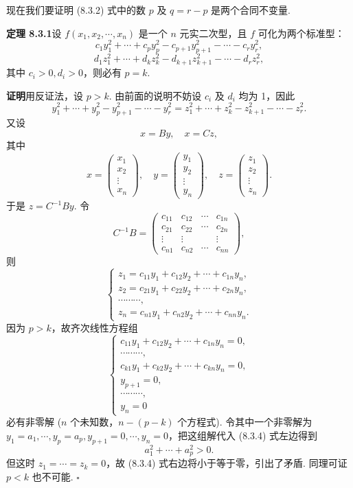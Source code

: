 \documentclass[UTF8,12pt,a4paper,fontset=fandol]{ctexart}
\begin{document}
现在我们要证明 (8.3.2) 式中的数 $p$ 及 $q=r-p$ 是两个合同不变量.

\noindent\textbf{定理 8.3.1}\quad 设 $f(x_1,x_2,\cdots,x_n)$ 是一个 $n$ 元实二次型，且 $f$ 可化为两个标准型：
\[
c_1y_1^2+\cdots+c_py_p^2-c_{p+1}y_{p+1}^2-\cdots-c_ry_r^2,
\]
\[
d_1z_1^2+\cdots+d_kz_k^2-d_{k+1}z_{k+1}^2-\cdots-d_rz_r^2,
\]
其中 $c_i>0,d_i>0$，则必有 $p=k$.

\noindent\textbf{证明}\quad 用反证法，设 $p>k$. 由前面的说明不妨设 $c_i$ 及 $d_i$ 均为 1，因此
\begin{equation}
y_1^2+\cdots+y_p^2-y_{p+1}^2-\cdots-y_r^2
=
z_1^2+\cdots+z_k^2-z_{k+1}^2-\cdots-z_r^2.
\tag{8.3.4}
\end{equation}
又设
\[
x=By,\quad x=Cz,
\]
其中
\[
x=\left(\begin{array}{c}x_1\\x_2\\\vdots\\x_n\end{array}\right),\quad
y=\left(\begin{array}{c}y_1\\y_2\\\vdots\\y_n\end{array}\right),\quad
z=\left(\begin{array}{c}z_1\\z_2\\\vdots\\z_n\end{array}\right).
\]
于是 $z=C^{-1}By$. 令
\[
C^{-1}B=\left(\begin{array}{cccc}
c_{11}&c_{12}&\cdots&c_{1n}\\
c_{21}&c_{22}&\cdots&c_{2n}\\
\vdots&\vdots&&\vdots\\
c_{n1}&c_{n2}&\cdots&c_{nn}
\end{array}\right),
\]
则
\[
\left\{\begin{array}{l}
z_1=c_{11}y_1+c_{12}y_2+\cdots+c_{1n}y_n,\\
z_2=c_{21}y_1+c_{22}y_2+\cdots+c_{2n}y_n,\\
\cdots\cdots\cdots,\\
z_n=c_{n1}y_1+c_{n2}y_2+\cdots+c_{nn}y_n.
\end{array}\right.
\]
因为 $p>k$，故齐次线性方程组
\[
\left\{\begin{array}{l}
c_{11}y_1+c_{12}y_2+\cdots+c_{1n}y_n=0,\\
\cdots\cdots\cdots,\\
c_{k1}y_1+c_{k2}y_2+\cdots+c_{kn}y_n=0,\\
y_{p+1}=0,\\
\cdots\cdots\cdots,\\
y_n=0
\end{array}\right.
\]
必有非零解 ($n$ 个未知数，$n-(p-k)$ 个方程式). 令其中一个非零解为 $y_1=a_1,\cdots,y_p=a_p,y_{p+1}=0,\cdots,y_n=0$，把这组解代入 (8.3.4) 式左边得到
\[
a_1^2+\cdots+a_p^2>0.
\]
但这时 $z_1=\cdots=z_k=0$，故 (8.3.4) 式右边将小于等于零，引出了矛盾. 同理可证 $p<k$ 也不可能. $\square$
\end{document}

